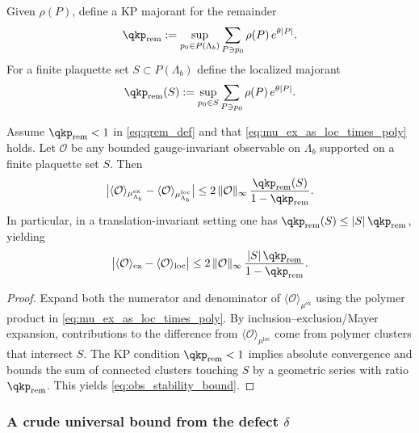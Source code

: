 Given $\rho(P)$, define a KP majorant for the remainder
\begin{equation}\label{eq:qrem_def}
\qkp_{\mathrm{rem}}
:=
\sup_{p_0\in P(\Lambda_b)}
\sum_{P\ni p_0}\rho(P)\,e^{\theta|P|}.
\end{equation}
For a finite plaquette set $S\subset P(\Lambda_b)$ define the localized majorant
\begin{equation}\label{eq:qrem_S_def}
\qkp_{\mathrm{rem}}(S)
:=
\sup_{p_0\in S}
\sum_{P\ni p_0}\rho(P)\,e^{\theta|P|}.
\end{equation}

\begin{theorem}\label{thm:obs_stability}
Assume $\qkp_{\mathrm{rem}}<1$ in \eqref{eq:qrem_def} and that \eqref{eq:mu_ex_as_loc_times_poly} holds.
Let $\mathcal O$ be any bounded gauge-invariant observable on $\Lambda_b$ supported on a finite plaquette set $S$.
Then
\begin{equation}\label{eq:obs_stability_bound}
\bigl|\langle \mathcal O\rangle_{\mu^{\mathrm{ex}}_{\Lambda_b}}-\langle \mathcal O\rangle_{\mu^{\mathrm{loc}}_{\Lambda_b}}\bigr|
\le
2\,\|\mathcal O\|_{\infty}\,
\frac{\qkp_{\mathrm{rem}}(S)}{1-\qkp_{\mathrm{rem}}}.
\end{equation}
In particular, in a translation-invariant setting one has $\qkp_{\mathrm{rem}}(S)\le |S|\,\qkp_{\mathrm{rem}}$, yielding
\[
\bigl|\langle \mathcal O\rangle_{\mathrm{ex}}-\langle \mathcal O\rangle_{\mathrm{loc}}\bigr|
\le
2\,\|\mathcal O\|_{\infty}\,
\frac{|S|\,\qkp_{\mathrm{rem}}}{1-\qkp_{\mathrm{rem}}}.
\]
\end{theorem}

\begin{proof}

Expand both the numerator and denominator of $\langle\mathcal O\rangle_{\mu^{\mathrm{ex}}}$ using the polymer product in \eqref{eq:mu_ex_as_loc_times_poly}.
By inclusion--exclusion/Mayer expansion, contributions to the difference from $\langle\mathcal O\rangle_{\mu^{\mathrm{loc}}}$ come from polymer clusters that intersect $S$.
The KP condition $\qkp_{\mathrm{rem}}<1$ implies absolute convergence and bounds the sum of connected clusters touching $S$ by a geometric series with ratio $\qkp_{\mathrm{rem}}$.
This yields \eqref{eq:obs_stability_bound}.
\end{proof}

\subsubsection{A crude universal bound from the defect \texorpdfstring{$\delta$}{delta}}

